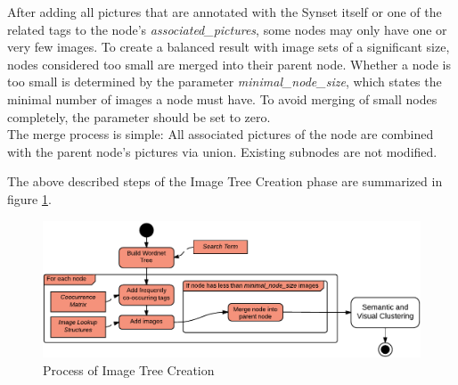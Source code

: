 After adding all pictures that are annotated with the Synset itself or one of the related tags to the node's \emph{associated\_pictures}, some nodes may only have one or very few images. To create a balanced result with image sets of a significant size, nodes considered too small are merged into their parent node. Whether a node is too small is determined by the parameter \emph{minimal\_node\_size}, which states the minimal number of images a node must have. To avoid merging of small nodes completely, the parameter should be set to zero.\\
The merge process is simple: All associated pictures of the node are combined with the parent node's pictures via union. Existing subnodes are not modified.

\bigskip
The above described steps of the Image Tree Creation phase are summarized in figure \ref{fig_imagetreecreation}.

\begin{figure}[h]
\centering
\includegraphics[width=\textwidth]{images/image_tree_creation.pdf}
\caption{Process of Image Tree Creation}
\label{fig_imagetreecreation}
\end{figure}
